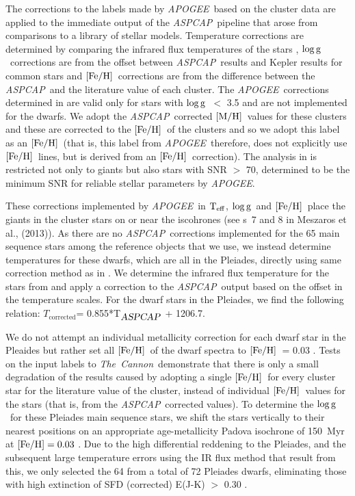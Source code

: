 \documentclass[12pt, preprint]{aastex}
\newcommand{\figurenames}{\figurename s}
\newcommand{\tc}{\textsl{The~Cannon}}
\newcommand{\apogee}{\textsl{APOGEE}}
\newcommand{\aspcap}{\textsl{ASPCAP}}
\newcommand{\teff}{\mbox{$\rm T_{eff}$}}
\newcommand{\feh}{\mbox{$\rm [Fe/H]$}}
\newcommand{\mh}{\mbox{$\rm [M/H]$}}
\newcommand{\logg}{\mbox{$\rm \log g$}}
\begin{document}
The corrections to the labels made by \apogee\ based on the cluster data are applied to the immediate output of the \aspcap\ pipeline that arose from comparisons to a library of stellar models.
Temperature corrections are determined by comparing the infrared flux temperatures of the stars \citep{gonzalez2009}, \logg\ corrections are from the offset between \aspcap\ results and Kepler results for common stars and \feh\ corrections are from the difference between the \aspcap\ and  the literature value of each cluster.  
The \apogee\ corrections determined in \citet{Meszaros2013} are valid only for stars with \logg\ $<$ 3.5 and are not implemented for the dwarfs.  We adopt the \aspcap\ corrected \mh\ values for these clusters and these are corrected to the \feh\ of the clusters and so we adopt this label as an \feh\ (that is, this label from \apogee\ therefore, does not explicitly use \feh\ lines, but is derived from an \feh\ correction). 
The analysis in \citet{Meszaros2013} is restricted not only to giants but also stars with SNR $>$ 70, determined to be the minimum SNR for reliable stellar parameters by \apogee.

These corrections implemented by \apogee\ in \teff, \logg\ and  \feh\ place the giants in the cluster stars on or near the iscohrones (see \figurenames~7 and 8 in Meszaros et al., (2013)).  
As there are no \aspcap\ corrections implemented for the 65 main sequence stars among the reference objects that we use, 
we instead determine temperatures for these dwarfs, which are all in the Pleiades, directly using same correction method 
as in \citet{Meszaros2013}. 
We determine the infrared flux temperature for the stars from \citet{gonzalez2009} and apply a correction to 
the \aspcap\ output based on the offset in the temperature scales. For the dwarf stars in the Pleiades, we find the following relation:
 $T_{\mbox{corrected}}$= 0.855*T$_{\mbox{\textit{\aspcap}}}$ + 1206.7.

We do not attempt an individual metallicity correction for each dwarf star in the Pleaides but rather set all \feh\ of the dwarf spectra to \feh\ = 0.03 \citep{barrado2001}.
Tests on the input labels to \tc\ demonstrate that there is only a small degradation of the results caused by adopting a single \feh\ for every cluster star for the literature value of the cluster, instead of individual \feh\ values for the stars (that is, from the \aspcap\ corrected values). 
To determine the \logg\ for these Pleiades main sequence stars, we shift the stars vertically to their nearest positions on an appropriate age-metallicity Padova isochrone of 150~Myr at $\feh = 0.03$ \citep{girardi2000}. 
Due to the high differential reddening to the Pleiades, and the subsequent large temperature errors using the IR flux method that result from this, we only selected the 64 from a total of 72 Pleiades dwarfs, eliminating those with high extinction of SFD (corrected) E(J-K) $>$ 0.30 \citep{Schlafly2011}.
\end{document}
